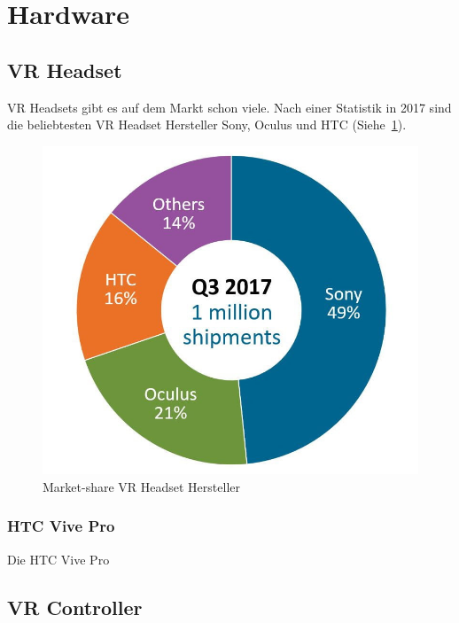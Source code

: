 \usepackage{wasysym}\section{Hardware}

\subsection{VR Headset}\label{sec:vr-headset}

VR Headsets gibt es auf dem Markt schon viele.
Nach einer Statistik in 2017 sind die beliebtesten VR Headset Hersteller Sony, Oculus und HTC (Siehe~\ref{fig:vr_headset_manufacturer_marketshare}).

\begin{figure}
    \includegraphics[scale=0.5]{pics/vr_headset_manufacturer_marketshare}
    \caption{Market-share VR Headset Hersteller~\cite{MARTINDALE_2017}}
    \label{fig:vr_headset_manufacturer_marketshare}
\end{figure}

\subsubsection{HTC Vive Pro}

Die HTC Vive Pro

\subsection{VR Controller}\label{sec:vr-controller}

